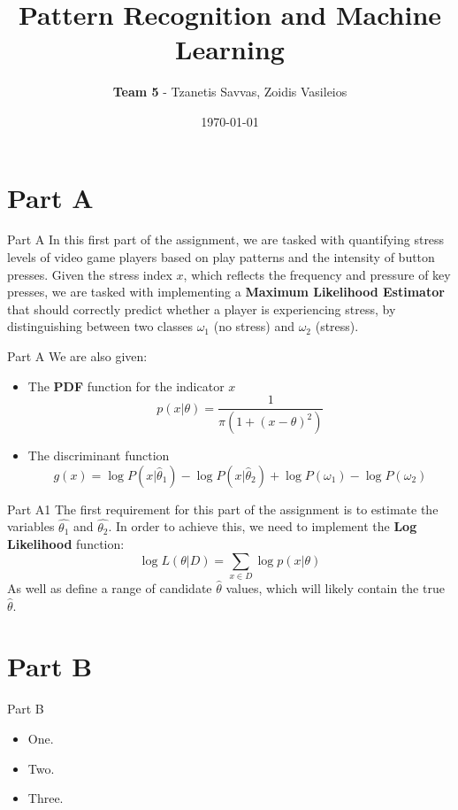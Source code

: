 \documentclass{beamer}
\title{Pattern Recognition and Machine Learning}
\author{\textbf{Team 5} - Tzanetis Savvas, Zoidis Vasileios}
\date{\today}
\begin{document}
\begin{frame}
    \titlepage
\end{frame}

\section{Part A}
    \begin{frame}{Part A}
    In this first part of the assignment, we are tasked with quantifying stress levels of video game players based on play patterns and the intensity of button presses. Given the stress index $x$, which reflects the frequency and pressure of key presses, we are tasked with implementing a \textbf{Maximum Likelihood Estimator} that should correctly predict whether a player is experiencing stress, by distinguishing between two classes $\omega_1$ (no stress) and $\omega_2$ (stress).
    \end{frame}

    \begin{frame}{Part A}
    We are also given:
    \begin{itemize}
    \item The \textbf{PDF} function for the indicator $x$ \[
    p(x|\theta) = \frac{1}{\pi(1+(x-\theta)^2)}
    \]
    \item The discriminant function \[
    g(x) = \log{P(x|\hat{\theta}_1)} - \log{P(x|\hat{\theta}_2)} + \log{P(\omega_1)} - \log{P(\omega_2)}
    \]
    \end{itemize}
    \end{frame}

    \begin{frame}{Part A1}
    The first requirement for this part of the assignment is to estimate the variables $\hat{\theta_1}$ and $\hat{\theta_2}$. In order to achieve this, we need to implement the \textbf{Log Likelihood} function: \[
    \log{L(\theta|D) = \sum_{x \in D}\log{p(x|\theta)}}
    \]
    As well as define a range of candidate $\hat{\theta}$ values, which will likely contain the true $\hat{\theta}$.
    \end{frame}

\section{Part B}
    \begin{frame}{Part B}
        \begin{itemize}
            \item One.
            \item Two.
            \item Three.
        \end{itemize}
    \end{frame}
\end{document}
